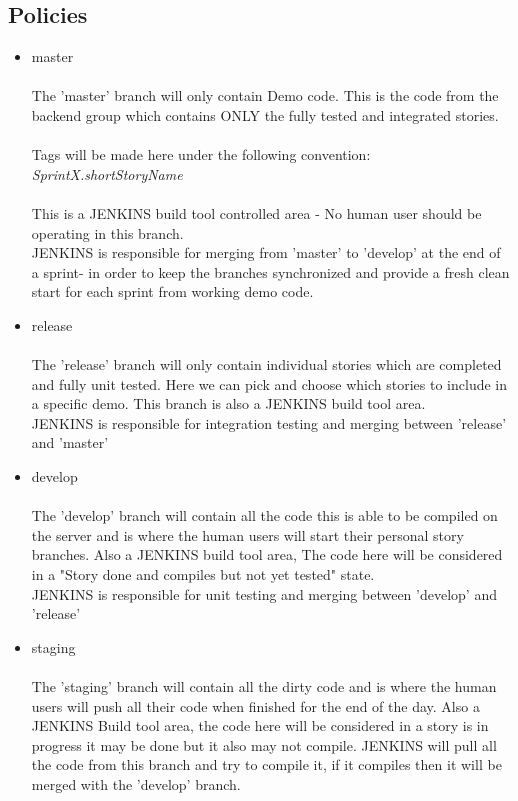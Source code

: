 \subsection {Policies}
\begin{itemize}
\item master\\ \\
The 'master' branch will only contain Demo code. This is the code from the backend group which contains ONLY the fully tested and integrated stories.  \\\\Tags will be made here under the following convention:\\ \emph{SprintX.shortStoryName} \\\\
This is a JENKINS build tool controlled area - No human user should be operating in this branch. \\JENKINS is responsible for  merging from 'master' to 'develop' at the end of a sprint- in order to keep the branches synchronized and provide a fresh clean start for each sprint from working demo code.\\
\item release\\ \\
The 'release' branch will only contain individual stories which are completed and fully unit tested. Here we can pick and choose which stories to include in a specific demo. This branch is also a JENKINS build tool area. \\JENKINS is responsible for integration testing and merging between 'release' and 'master'
\item develop\\ \\
The 'develop' branch will contain all the code this is able to be compiled on the server and is where the human users will start their personal story branches. Also a JENKINS build tool area, The code here will be considered in a "Story done and compiles but not yet tested" state.\\ JENKINS is responsible for unit testing and merging between 'develop' and 'release'

\item staging \\ \\
The 'staging' branch will contain all the dirty code and is where the human users will push all their code when finished for the end of the day. Also a JENKINS Build tool area, the code here will be considered in a story is in progress it may be done but it also may not compile. JENKINS will pull all the code from this branch and try to compile it, if it compiles then it will be merged with the 'develop' branch.


\end{itemize}
